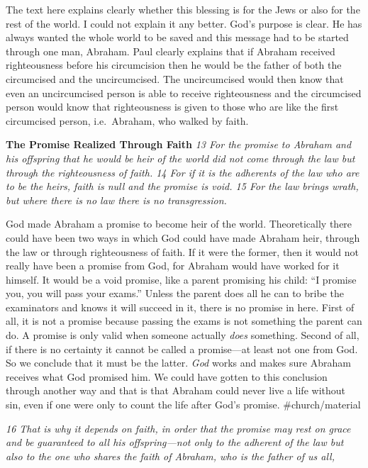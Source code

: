 The text here explains clearly whether this blessing is for the Jews or
also for the rest of the world. I could not explain it any better. God's
purpose is clear. He has always wanted the whole world to be saved and
this message had to be started through one man, Abraham. Paul clearly
explains that if Abraham received righteousness before his circumcision
then he would be the father of both the circumcised and the
uncircumcised. The uncircumcised would then know that even an
uncircumcised person is able to receive righteousness and the
circumcised person would know that righteousness is given to those who
are like the first circumcised person, i.e.~Abraham, who walked by
faith.

\textbf{The Promise Realized Through Faith} \emph{13 For the promise to
Abraham and his offspring that he would be heir of the world did not
come through the law but through the righteousness of faith. 14 For if
it is the adherents of the law who are to be the heirs, faith is null
and the promise is void. 15 For the law brings wrath, but where there is
no law there is no transgression.}

God made Abraham a promise to become heir of the world. Theoretically
there could have been two ways in which God could have made Abraham
heir, through the law or through righteousness of faith. If it were the
former, then it would not really have been a promise from God, for
Abraham would have worked for it himself. It would be a void promise,
like a parent promising his child: ``I promise you, you will pass your
exams.'' Unless the parent does all he can to bribe the examinators and
knows it will succeed in it, there is no promise in here. First of all,
it is not a promise because passing the exams is not something the
parent can do. A promise is only valid when someone actually \emph{does}
something. Second of all, if there is no certainty it cannot be called a
promise---at least not one from God. So we conclude that it must be the
latter. \emph{God} works and makes sure Abraham receives what God
promised him. We could have gotten to this conclusion through another
way and that is that Abraham could never live a life without sin, even
if one were only to count the life after God's promise.
\#church/material

\emph{16 That is why it depends on faith, in order that the promise may
rest on grace and be guaranteed to all his offspring---not only to the
adherent of the law but also to the one who shares the faith of Abraham,
who is the father of us all,}

